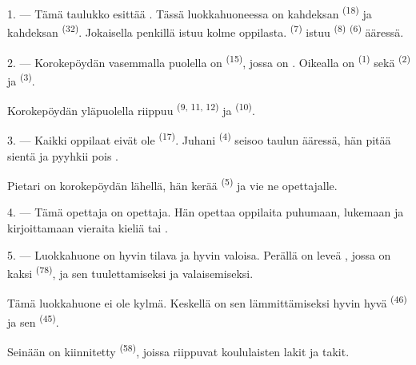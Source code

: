 \VUsaut{1.4mm}
\VUsaut{2.2mm}
\VUfilet{20mm}
\VUsaut{6.4mm}

\VUsaut{3.0mm}

1. --- Tämä taulukko esittää  .
Tässä luokkahuoneessa on kahdeksan  \textsuperscript{(18)} ja
kahdeksan  \textsuperscript{(32)}. Jokaisella penkillä istuu
kolme oppilasta.  \textsuperscript{(7)} istuu
 \textsuperscript{(8)} 
\textsuperscript{(6)} ääressä.

2. --- Korokepöydän vasemmalla puolella on 
\textsuperscript{(15)}, jossa on . Oikealla on
 \textsuperscript{(1)} sekä 
\textsuperscript{(2)} ja  \textsuperscript{(3)}.

Korokepöydän yläpuolella riippuu 
\textsuperscript{(9, 11, 12)} ja  \textsuperscript{(10)}.

3. --- Kaikki oppilaat eivät ole  \textsuperscript{(17)}.
Juhani \textsuperscript{(4)} seisoo taulun ääressä, hän pitää sientä ja pyyhkii
pois .

Pietari on korokepöydän lähellä, hän kerää 
\textsuperscript{(5)} ja vie ne opettajalle.

4. --- Tämä opettaja on  opettaja. Hän opettaa oppilaita
puhumaan, lukemaan ja kirjoittamaan vieraita kieliä  tai .

5. --- Luokkahuone on hyvin tilava ja hyvin valoisa. Perällä on leveä
, jossa on kaksi  \textsuperscript{(78)}, ja
 sen tuulettamiseksi ja valaisemiseksi.

Tämä luokkahuone ei ole kylmä. Keskellä on sen lämmittämiseksi hyvin hyvä
 \textsuperscript{(46)} ja sen 
\textsuperscript{(45)}.

Seinään on kiinnitetty  \textsuperscript{(58)}, joissa
riippuvat koululaisten lakit ja takit.

\VUsaut{5.2mm}
\VUsaut{3.6mm}


